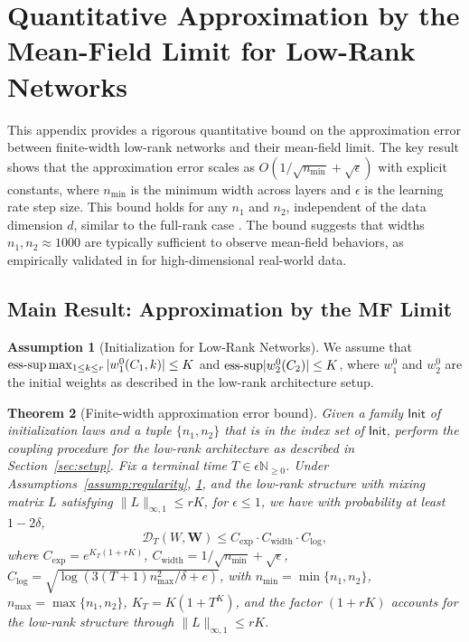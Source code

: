 \documentclass[nohyperref]{article}
\theoremstyle{plain}
\newtheorem{theorem}{Theorem}[section]
\theoremstyle{definition}
\newtheorem{assumption}[theorem]{Assumption}
\theoremstyle{remark}
\begin{document}
\section{Quantitative Approximation by the Mean-Field Limit for Low-Rank Networks}
\label{app:quantitative}

This appendix provides a rigorous quantitative bound on the approximation error between finite-width low-rank networks and their mean-field limit. The key result shows that the approximation error scales as $O(1/\sqrt{n_{\min}} + \sqrt{\epsilon})$ with explicit constants, where $n_{\min}$ is the minimum width across layers and $\epsilon$ is the learning rate step size. This bound holds for any $n_1$ and $n_2$, independent of the data dimension $d$, similar to the full-rank case \cite{nguyen2020global,nguyen2023rigorousframeworkmeanfield}. The bound suggests that widths $n_1, n_2 \approx 1000$ are typically sufficient to observe mean-field behaviors, as empirically validated in \cite{nguyen2019meanfield} for high-dimensional real-world data.

\subsection{Main Result: Approximation by the MF Limit}

\begin{assumption}[Initialization for Low-Rank Networks]
\label{assump:quant-init}
We assume that ${\rm ess\text{-}sup}\max_{1\le k\le r}|w_1^0(C_1,k)| \le K$ and ${\rm ess\text{-}sup}|w_2^0(C_2)| \le K$, where $w_1^0$ and $w_2^0$ are the initial weights as described in the low-rank architecture setup.
\end{assumption}

\begin{theorem}[Finite-width approximation error bound]
\label{thm:quantitative-lowrank}
Given a family $\mathsf{Init}$ of initialization laws and a tuple $\{n_1, n_2\}$ that is in the index set of $\mathsf{Init}$, perform the coupling procedure for the low-rank architecture as described in Section~\ref{sec:setup}. Fix a terminal time $T \in \epsilon\mathbb{N}_{\ge 0}$. Under Assumptions~\ref{assump:regularity}, \ref{assump:quant-init}, and the low-rank structure with mixing matrix $L$ satisfying $\|L\|_{\infty,1} \le rK$, for $\epsilon \le 1$, we have with probability at least $1-2\delta$,
\[
\mathscr{D}_T(W, \mathbf{W}) \le C_{\exp} \cdot C_{\text{width}} \cdot C_{\log},
\]
where $C_{\exp} = e^{K_T(1+rK)}$, $C_{\text{width}} = 1/\sqrt{n_{\min}} + \sqrt{\epsilon}$, $C_{\log} = \sqrt{\log(3(T+1)n_{\max}^2/\delta + e)}$, with $n_{\min} = \min\{n_1, n_2\}$, $n_{\max} = \max\{n_1, n_2\}$, $K_T = K(1+T^K)$, and the factor $(1+rK)$ accounts for the low-rank structure through $\|L\|_{\infty,1} \le rK$.

\end{theorem}
\end{document}
